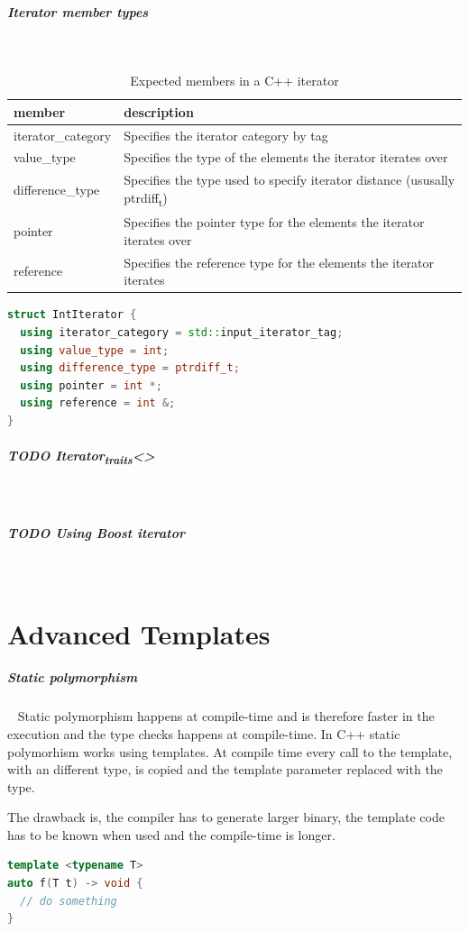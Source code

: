 \documentclass[11pt,twoside,landscape]{article}
\begin{document}
\begin{multicols}{2}
\subparagraph{Iterator member types} \
\label{sec:org285de1c}
\begin{table}[htbp]
\caption{\label{tab:org8ba45d6}Expected members in a C++ iterator}
\centering
\begin{tabular}{ll}
member & description\\[0pt]
\hline
iterator\_category & Specifies the iterator category by tag\\[0pt]
value\_type & Specifies the type of the elements the iterator iterates over\\[0pt]
difference\_type & Specifies the type used to specify iterator distance (ususally ptrdiff\textsubscript{t})\\[0pt]
pointer & Specifies the pointer type for the elements the iterator iterates over\\[0pt]
reference & Specifies the reference type for the elements the iterator iterates\\[0pt]
\end{tabular}
\end{table}


\begin{lstlisting}[language=c++,label=lst:orgc7c1191,caption={Example member types for an iterator},captionpos=b,numbers=none]
struct IntIterator {
  using iterator_category = std::input_iterator_tag;
  using value_type = int;
  using difference_type = ptrdiff_t;
  using pointer = int *;
  using reference = int &;
}
\end{lstlisting}

\subparagraph{{\bfseries\sffamily TODO} Iterator\textsubscript{traits}<>} \
\label{sec:orgbe9182a}
\subparagraph{{\bfseries\sffamily TODO} Using Boost iterator} \
\label{sec:orgc76e81b}
\section{Advanced Templates}
\label{sec:org1d8884b}
\subparagraph{Static polymorphism} \
\label{sec:orgbeb6011}
Static polymorphism happens at compile-time and is therefore faster in the execution and the type checks happens at compile-time.
In C++ static polymorhism works using templates.
At compile time every call to the template, with an different type, is copied and the template parameter replaced with the type.

The drawback is, the compiler has to generate larger binary, the template code has to be known when used and the compile-time is longer.

\begin{lstlisting}[language=c++,label=lst:org5b4253b,caption={Example for a C++ template},captionpos=b,numbers=none]
template <typename T>
auto f(T t) -> void {
  // do something
}


\end{lstlisting}
\end{multicols}
\end{document}

